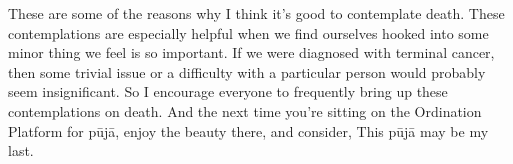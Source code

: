 These are some of the reasons why I think it's good to contemplate 
death. These contemplations are especially helpful when we find 
ourselves hooked into some minor thing we feel is so important. If we 
were diagnosed with terminal cancer, then some trivial issue or a 
difficulty with a particular person would probably seem insignificant. 
So I encourage everyone to frequently bring up these contemplations on 
death. And the next time you're sitting on the Ordination Platform for 
pūjā, enjoy the beauty there, and consider, This pūjā may be my 
last.

